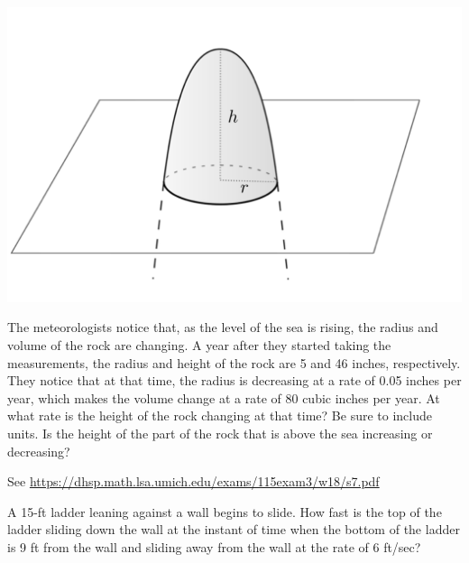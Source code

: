 \documentclass[11pt]{exam}
\begin{document}
\begin{questions}
\vspace{-1em}
\begin{center}
  \includegraphics[scale=0.4]{Figures/rock.png}
\end{center}
\vspace{-0.7em}
The meteorologists notice that, as the level of the sea is rising, the radius and volume of the rock are changing. A year after they started taking the measurements, the radius and height of the rock are 5 and 46 inches, respectively. They notice that at that time, the radius is decreasing at a rate of 0.05 inches per year, which makes the volume change at a rate of 80 cubic inches per year. At what rate is the height of the rock changing at that time? Be sure to include units. Is the height of the part of the rock that is above the sea increasing or decreasing?
\begin{solution}
  See \href{https://dhsp.math.lsa.umich.edu/exams/115exam3/w18/s7.pdf}{https://dhsp.math.lsa.umich.edu/exams/115exam3/w18/s7.pdf}
\end{solution}
\question A 15-ft ladder leaning against a wall begins to slide. How fast is the top of the ladder sliding down the wall at the instant of time when the bottom of the ladder is 9 ft from the wall and sliding away from the wall at the rate of 6 ft/sec?
\\
\begin{center}
\end{center}

\end{questions}
\end{document}
